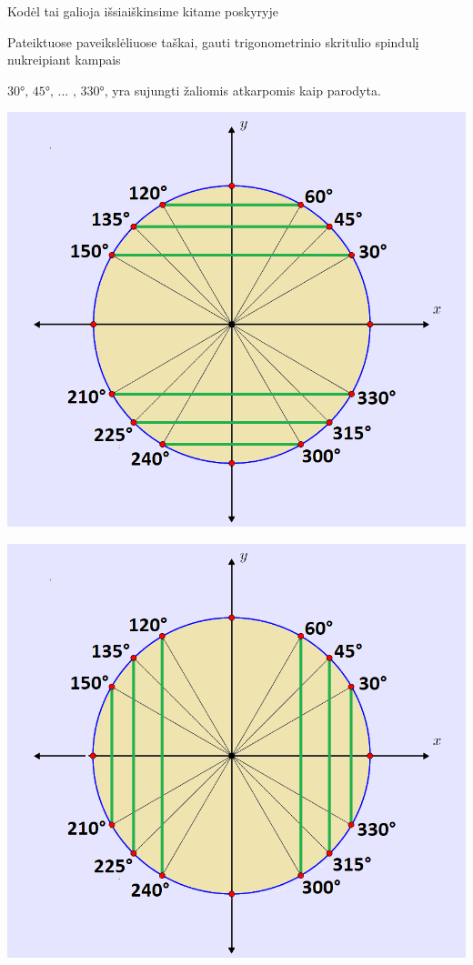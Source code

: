 \documentclass[a4paper]{article}
\begin{document}
Kodėl tai galioja išsiaiškinsime kitame poskyryje
\begin{mdframed}[backgroundcolor=blue!10!white, linewidth=3pt]
Pateiktuose paveikslėliuose taškai, gauti trigonometrinio skritulio spindulį nukreipiant kampais 

$\text{30°, 45°, ... , 330°}$, yra sujungti žaliomis atkarpomis kaip parodyta.

\begin{minipage}[b]{0.45\linewidth}
\includegraphics[width=\textwidth]{hlevels.png}
\end{minipage}
\begin{minipage}[b]{0.45\linewidth}
\includegraphics[width=\textwidth]{vlevels.png}

\end{minipage}
\end{mdframed}
\end{document}
